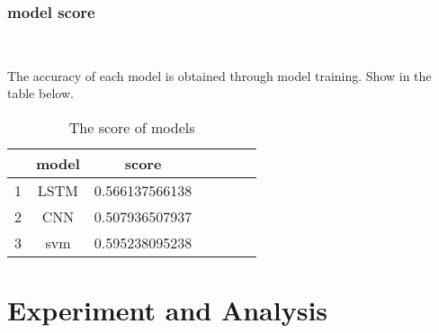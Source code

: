 

 \subsubsection{model score}
 \

 The accuracy of each model is obtained through model training. Show in the table below.
 \
 
 \begin{table}[htbp]  \centering
    \caption{The score of models}
    \label{tbl:data information}
    \begin{tabular}{ccccccc}
      \hline
      & model          & score \\
      \hline
      1 &  LSTM          & 0.566137566138  \\
      2 &  CNN           & 0.507936507937  \\
      3 &  svm           & 0.595238095238  \\
      \hline 
    \end{tabular}
  \end{table}







\section{Experiment and Analysis}
\

